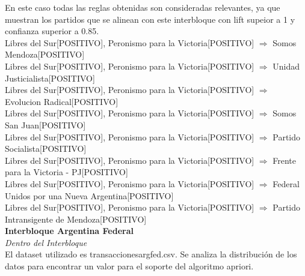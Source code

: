 \documentclass{endm}
\begin{document}
En este caso todas las reglas obtenidas son consideradas relevantes, ya que muestran los partidos que se alinean con este interbloque con lift supeior a 1 y confianza superior a 0.85. \\

{Libres del Sur[POSITIVO], Peronismo para la Victoria[POSITIVO]} $\Longrightarrow$ {Somos Mendoza[POSITIVO]}  \\

{Libres del Sur[POSITIVO], Peronismo para la Victoria[POSITIVO]} $\Longrightarrow$ {Unidad Justicialista[POSITIVO]} \\

{Libres del Sur[POSITIVO], Peronismo para la Victoria[POSITIVO]} $\Longrightarrow$ {Evolucion Radical[POSITIVO]} \\

{Libres del Sur[POSITIVO], Peronismo para la Victoria[POSITIVO]} $\Longrightarrow$ {Somos San Juan[POSITIVO]} \\

{Libres del Sur[POSITIVO], Peronismo para la Victoria[POSITIVO]} $\Longrightarrow$ {Partido Socialista[POSITIVO]} \\

{Libres del Sur[POSITIVO], Peronismo para la Victoria[POSITIVO]} $\Longrightarrow$ {Frente para la Victoria - PJ[POSITIVO]} \\

{Libres del Sur[POSITIVO], Peronismo para la Victoria[POSITIVO]} $\Longrightarrow$ {Federal Unidos por una Nueva Argentina[POSITIVO]} \\

{Libres del Sur[POSITIVO], Peronismo para la Victoria[POSITIVO]} $\Longrightarrow$ {Partido Intransigente de Mendoza[POSITIVO]} \\

\textbf{Interbloque Argentina Federal}\\

\textit{Dentro del Interbloque} \\

El dataset utilizado es transaccionesargfed.csv. Se analiza la distribución de los datos para encontrar un valor para el soporte del algoritmo apriori. \\
\end{document}
